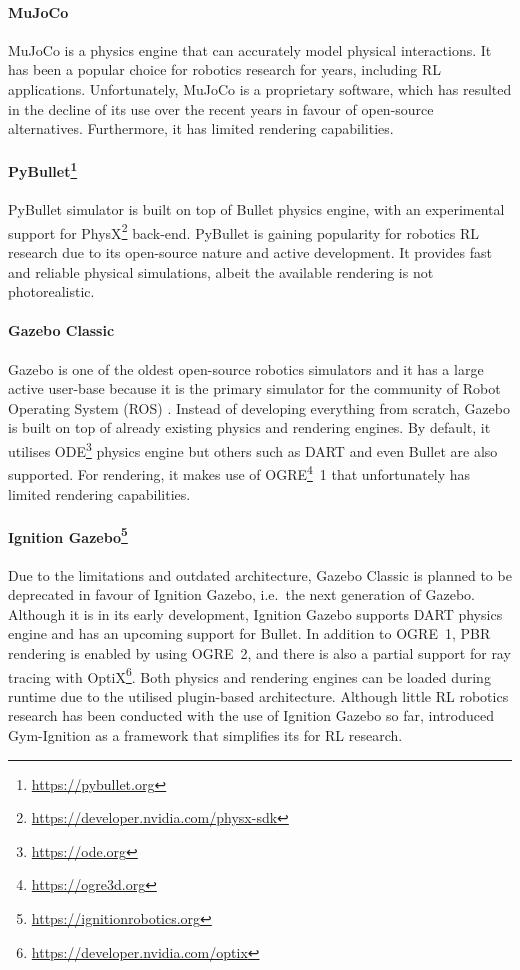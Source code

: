 \paragraph{MuJoCo~\protect\cite{todorov_mujoco_2012}} MuJoCo is a physics engine that can accurately model physical interactions. It has been a popular choice for robotics research for years, including RL applications. Unfortunately, MuJoCo is a proprietary software, which has resulted in the decline of its use over the recent years in favour of open-source alternatives. Furthermore, it has limited rendering capabilities.

\paragraph{PyBullet\protect\footnote{\href{https://pybullet.org}{https://pybullet.org}}} PyBullet simulator is built on top of Bullet physics engine, with an experimental support for PhysX\footnote{\href{https://developer.nvidia.com/physx-sdk}{https://developer.nvidia.com/physx-sdk}} back-end. PyBullet is gaining popularity for robotics RL research due to its open-source nature and active development. It provides fast and reliable physical simulations, albeit the available rendering is not photorealistic.

\paragraph{Gazebo Classic~\protect\cite{koenig_design_2004}} Gazebo is one of the oldest open-source robotics simulators and it has a large active user-base because it is the primary simulator for the community of Robot Operating System (ROS) \cite{quigley_ros_2009}. Instead of developing everything from scratch, Gazebo is built on top of already existing physics and rendering engines. By default, it utilises ODE\footnote{\href{https://ode.org}{https://ode.org}} physics engine but others such as DART \cite{lee_dart_2018} and even Bullet are also supported. For rendering, it makes use of OGRE\footnote{\href{https://ogre3d.org}{https://ogre3d.org}}~1 that unfortunately has limited rendering capabilities.

\paragraph{Ignition Gazebo\protect\footnote{\href{https://ignitionrobotics.org}{https://ignitionrobotics.org}}} Due to the limitations and outdated architecture, Gazebo Classic is planned to be deprecated in favour of Ignition Gazebo, i.e.~the next generation of Gazebo. Although it is in its early development, Ignition Gazebo supports DART physics engine and has an upcoming support for Bullet. In addition to OGRE~1, PBR rendering is enabled by using OGRE~2, and there is also a partial support for ray tracing with OptiX\footnote{\href{https://developer.nvidia.com/optix}{https://developer.nvidia.com/optix}}. Both physics and rendering engines can be loaded during runtime due to the utilised plugin-based architecture. Although little RL robotics research has been conducted with the use of Ignition Gazebo so far, \citet{ferigo_gym-ignition_2020} introduced Gym-Ignition as a framework that simplifies its for RL research.

